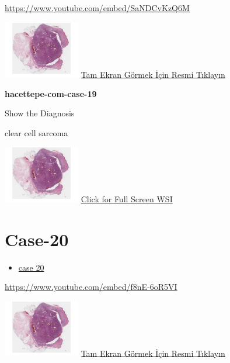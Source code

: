 \documentclass[
  letterpaper,
  paper=6in:9in,
  pagesize=pdftex,
  headinclude=on,
  footinclude=on,
  12pt]{scrbook}
\providecommand{\tightlist}{%
  \setlength{\itemsep}{0pt}\setlength{\parskip}{0pt}}\usepackage{longtable,booktabs,array}
\begin{document}
\url{https://www.youtube.com/embed/SaNDCvKzQ6M}

\href{https://images.patolojiatlasi.com/hacettepe-com-case-1/HE.html}{\includegraphics[width=0.25\textwidth,height=\textheight]{./screenshots/hacettepe-com-case-1_screenshot.png}}
\href{https://images.patolojiatlasi.com/hacettepe-com-case-19/HE.html}{Tam
Ekran Görmek İçin Resmi Tıklayın}

\textbf{hacettepe-com-case-19}

Show the Diagnosis

\hypertarget{answer19}{}
clear cell sarcoma

\href{https://images.patolojiatlasi.com/hacettepe-com-case-1/HE.html}{\includegraphics[width=0.25\textwidth,height=\textheight]{./screenshots/hacettepe-com-case-1_screenshot.png}}
\href{https://images.patolojiatlasi.com/hacettepe-com-case-19/HE.html}{Click
for Full Screen WSI}

\hypertarget{sec-hacettepe-case-of-the-month-case-20}{%
\section{Case-20}\label{sec-hacettepe-case-of-the-month-case-20}}

\begin{itemize}
\tightlist
\item
  \href{https://www.youtube.com/watch?v=f8nE-6oR5VI\&ab_channel=KemalKosemehmetoglu}{case
  20}
\end{itemize}

\url{https://www.youtube.com/embed/f8nE-6oR5VI}

\href{https://images.patolojiatlasi.com/hacettepe-com-case-1/HE.html}{\includegraphics[width=0.25\textwidth,height=\textheight]{./screenshots/hacettepe-com-case-1_screenshot.png}}
\href{https://images.patolojiatlasi.com/hacettepe-com-case-/HE.html}{Tam
Ekran Görmek İçin Resmi Tıklayın}
\end{document}
